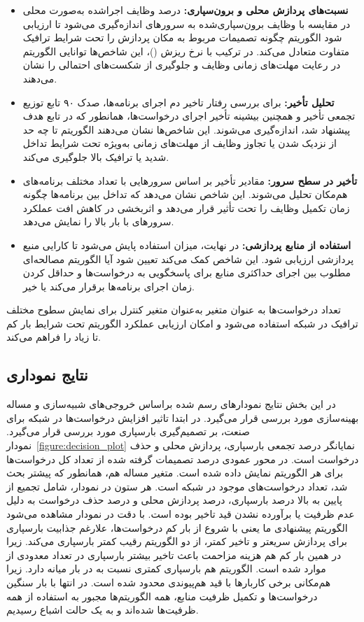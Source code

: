 \begin{itemize}
\item
\textbf{نسبت‌های پردازش محلی و برون‌سپاری:} درصد وظایف اجراشده به‌صورت محلی در مقایسه با وظایف برون‌سپاری‌شده به سرورهای  اندازه‌گیری می‌شود تا ارزیابی شود الگوریتم چگونه تصمیمات مربوط به مکان پردازش را تحت شرایط ترافیک متفاوت متعادل می‌کند. در ترکیب با نرخ ریزش ()، این شاخص‌ها توانایی الگوریتم در رعایت مهلت‌های زمانی وظایف و جلوگیری از شکست‌های احتمالی را نشان می‌دهند.
\item
\textbf{تحلیل تأخیر:} برای بررسی رفتار تاخیر دم اجرای برنامه‌ها، صدک ۹۰ تابع توزیع تجمعی تأخیر و همچنین بیشینه تأخیر اجرای درخواست‌ها، همانطور که در تابع هدف پیشنهاد شد، اندازه‌گیری می‌شوند. این شاخص‌ها نشان می‌دهند الگوریتم تا چه حد از نزدیک شدن یا تجاوز وظایف از مهلت‌های زمانی به‌ویژه تحت شرایط تداخل شدید یا ترافیک بالا جلوگیری می‌کند.
\item
\textbf{تأخیر در سطح سرور:} مقادیر تأخیر بر اساس سرورهایی با تعداد مختلف برنامه‌های هم‌مکان تحلیل می‌شوند. این شاخص نشان می‌دهد که تداخل بین برنامه‌ها چگونه زمان تکمیل وظایف را تحت تأثیر قرار می‌دهد و اثربخشی  در کاهش افت عملکرد سرورهای با بار بالا را نمایش می‌دهد.
\item
\textbf{استفاده از منابع پردازشی:} در نهایت، میزان استفاده  پایش می‌شود تا کارایی منبع پردازشی ارزیابی شود. این شاخص کمک می‌کند تعیین شود آیا الگوریتم مصالحه‌ای مطلوب بین اجرای حداکثری منابع برای پاسخگویی به درخواست‌ها و حداقل کردن زمان اجرای برنامه‌ها برقرار می‌کند یا خیر. 
\end{itemize}

تعداد درخواست‌ها به عنوان متغیر به‌عنوان متغیر کنترل برای نمایش سطوح مختلف ترافیک در شبکه  استفاده می‌شود و امکان ارزیابی عملکرد الگوریتم تحت شرایط بار کم تا زیاد را فراهم می‌کند.

\subsection{نتایج نموداری}

در این بخش‌ نتایج نمودارهای رسم شده براساس خروجی‌های شبیه‌سازی و مساله بهینه‌سازی مورد بررسی قرار می‌گیرد. در ابتدا تاثیر افزایش درخواست‌ها در شبکه  برای صنعت، بر تصمیم‌گیری بارسپاری مورد بررسی قرار می‌گیرد. نمودار~\ref{figure:decision_plot} نمایانگر درصد تجمعی بارسپاری، پردازش محلی و حذف درخواست است. در محور عمودی درصد تصمیمات گرفته شده از تعداد کل درخواست‌ها برای هر الگوریتم نمایش داده شده است. متغیر مساله هم، همانطور که پیشتر بحث شد، تعداد درخواست‌های موجود در شبکه است. هر ستون در نمودار، شامل تجمیع از پایین به بالا درصد بارسپاری، درصد پردازش محلی و درصد حذف درخواست به دلیل عدم ظرفیت یا برآورده نشدن قید تاخیر بوده است. با دقت در نمودار مشاهده می‌شود الگوریتم پیشنهادی ما یعنی  با شروع از بار کم درخواست‌ها، علارغم جذابیت بارسپاری برای پردازش سریعتر و تاخیر کمتر، از دو الگوریتم رقیب کمتر بارسپاری می‌کند. زیرا در همین بار کم هم هزینه مزاحمت باعث تاخیر بیشتر بارسپاری در تعداد معدودی از موارد شده است. الگوریتم  هم بارسپاری کمتری نسبت به  در بار میانه دارد. زیرا هم‌مکانی برخی کاربارها با قید هم‌پیوندی محدود شده است. در انتها با بار سنگین درخواست‌ها و تکمیل ظرفیت منابع، همه الگوریتم‌ها مجبور به استفاده از همه ظرفیت‌ها شده‌اند و به یک حالت اشباع رسیدیم.


